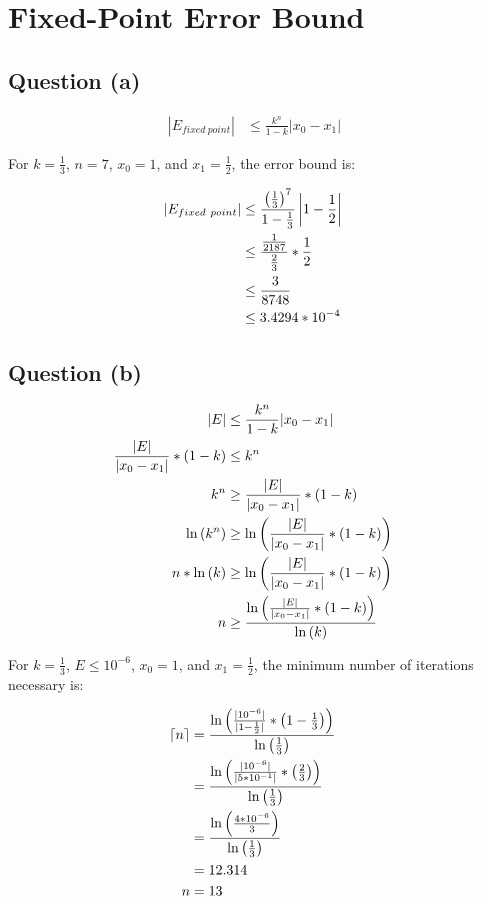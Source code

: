 \section{Fixed-Point Error Bound}

	\subsection{Question (a)}
	
	\begin{align}
		| E_{fixed \ point} | &\le \frac{k^{n}}{1-k}|x_{0} - x_{1}|&
	\label{eq:41a}
	\end{align}

	For $k = \frac{1}{3}$, $n = 7$, $x_{0} = 1$, and $x_{1} = \frac{1}{2}$, the error bound is:

	\begin{align}
		| E_{fixed \ point} | &\le \frac{\left(\frac{1}{3}\right)^{7}}{1-\frac{1}{3}}\left|1 - \frac{1}{2}\right|& \notag \\
		&\le \frac{\frac{1}{2187}}{\frac{2}{3}}*\frac{1}{2}& \notag \\
		&\le \frac{3}{8748} \notag \\
		&\le 3.4294 * 10^{-4}
	\label{eq:41as}
	\end{align}

	\subsection{Question (b)}

	\begin{align}
		| E | &\le \frac{k^{n}}{1-k}|x_{0} - x_{1}|& \notag \\
		\frac{| E |}{|x_{0} - x_{1}|}*(1-k) &\le k^{n}& \notag \\
		k^{n} &\ge \frac{| E |}{|x_{0} - x_{1}|}*(1-k)& \notag \\
		\ln{(k^{n})} &\ge \ln{\left(\frac{| E |}{|x_{0} - x_{1}|}*(1-k)\right)}& \notag \\
		n*\ln{(k)} &\ge \ln{\left(\frac{| E |}{|x_{0} - x_{1}|}*(1-k)\right)}& \notag \\
		n &\ge \frac{\ln{\left(\frac{| E |}{|x_{0} - x_{1}|}*(1-k)\right)}}{\ln{(k)}}&
	\label{eq:42b}
	\end{align}

	For $k = \frac{1}{3}$, $E \le 10^{-6}$, $x_{0} = 1$, and $x_{1} = \frac{1}{2}$, the minimum number of iterations necessary is:

	\begin{align}
		\lceil n \rceil &= \frac{\ln{\left(\frac{| 10^{-6} |}{|1 - \frac{1}{2}|}*\left(1-\frac{1}{3}\right)\right)}}{\ln{\left(\frac{1}{3}\right)}}& \notag \\
		&= \frac{\ln{\left(\frac{| 10^{-6} |}{|5 * 10^{-1}|}*\left(\frac{2}{3}\right)\right)}}{\ln{\left(\frac{1}{3}\right)}}& \notag \\
		&= \frac{\ln{\left(\frac{4 * 10^{-6}}{3}\right)}}{\ln{\left(\frac{1}{3}\right)}}& \notag \\
		&= 12.314 & \notag \\
		n &= 13 &
	\label{eq:42bs}
	\end{align}
